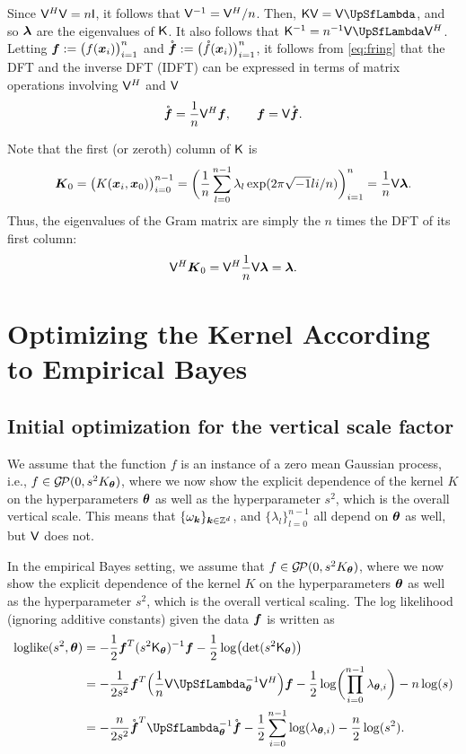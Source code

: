 \documentclass{amsart}
\newcommand{\rvf}{\mathring{\vf}}
\newcommand{\gp}{\mathcal{G}\!\mathcal{P}}
\begin{document}
Since $\mathsf{V}^H \mathsf{V} = n \mathsf{I}$, it follows that $\mathsf{V}^{-1} = \mathsf{V}^H/n$.  Then, 
$\mK \mV  =\mV \mLambda$, and so $\boldsymbol{\lambda}$ are the eigenvalues of $\mathsf{K}$.  It also follows that $\mK^{-1} = n^{-1} \mV \mLambda \mV^H$.  
Letting $\boldsymbol{f} := \bigl( f(\boldsymbol{x}_i) \bigr)_{i=1}^n$ and $\rvf := \bigl( \rf(\vx_i) \bigr)_{i=1}^n$, it follows from \eqref{eq:fring} that the DFT and the inverse DFT (IDFT) can be expressed in terms of matrix operations involving $\mathsf{V}^H$ and $\mathsf{V}$
\begin{equation}
    \rvf = \frac 1n \mV^H \vf, \qquad \vf = \mV \rvf.
\end{equation}

Note that the first (or zeroth) column of $\mathsf{K}$ is 
\begin{equation*}
    \boldsymbol{K}_0 = \bigl ( K(\boldsymbol{x}_i,\boldsymbol{x}_0)\bigr)_{i = 0}^{n-1}
    = \biggl( \frac 1n \sum_{l = 0}^{n-1} \lambda_l \exp(2 \pi \sqrt{-1} l i/n)\biggr)_{i=1}^n = \frac 1n \mathsf{V} \boldsymbol{\lambda}.
\end{equation*}
Thus, the eigenvalues of the Gram matrix are simply the $n$ times the DFT of its first column:
\begin{equation*}
    \mathsf{V}^{H} \boldsymbol{K}_0 = \mathsf{V}^{H} \frac 1n \mathsf{V} \boldsymbol{\lambda} = \boldsymbol{\lambda}.
\end{equation*}


\section{Optimizing the Kernel According to Empirical Bayes}
\subsection{Initial optimization for the vertical scale factor}
We assume that the function $f$ is an instance of a zero mean Gaussian process, i.e., $f \in \gp(0,s^2K_{\vtheta})$, where we now show the explicit dependence of the
kernel $K$ on the hyperparameters $\boldsymbol{\theta}$ as well as the hyperparameter $s^2$, which is the overall vertical scale.
This means that $\{\omega_{\boldsymbol{k}}\}_{\boldsymbol{k} \in \mathbb{Z}^d}$, and $\{\lambda_l \}_{l=0}^{n-1}$ all depend on $\boldsymbol{\theta}$ as well, but $\mathsf{V}$ does not.

In the empirical Bayes setting, we assume that $f \in \gp(0,s^2K_{\vtheta})$, where we now show the explicit dependence of the
kernel $K$ on the hyperparameters $\boldsymbol{\theta}$ as well as the hyperparameter $s^2$, which is the overall vertical scaling.  
The log likelihood (ignoring additive constants) given the data $\boldsymbol{f}$ is written as 
\begin{align}
	\text{loglike}(s^2,\vtheta) 
	& = - \frac 1{2} \vf^T (s^2\mK_{\vtheta})^{-1}\vf - \frac 12 \log\bigl(\det(s^2 \mK_{\vtheta})\bigr)  \\
	\nonumber 
	& = - \frac 1{2 s^2} \vf^T\Bigl(\frac 1n \mV \mLambda_{\vtheta}^{-1} \mV^H \Bigr)\vf 
	- \frac 12 \log\biggl(\prod_{i=0}^{n-1} \lambda_{\vtheta,i}\biggr) - n \log(s)  \\
	\nonumber 
	& = - \frac n{2 s^2} \rvf^T\mLambda_{\vtheta}^{-1} \rvf 
- \frac 12 \sum_{i=0}^{n-1} \log(\lambda_{\vtheta,i}) - \frac{n}2 \log(s^2).
\end{align}
\end{document}
